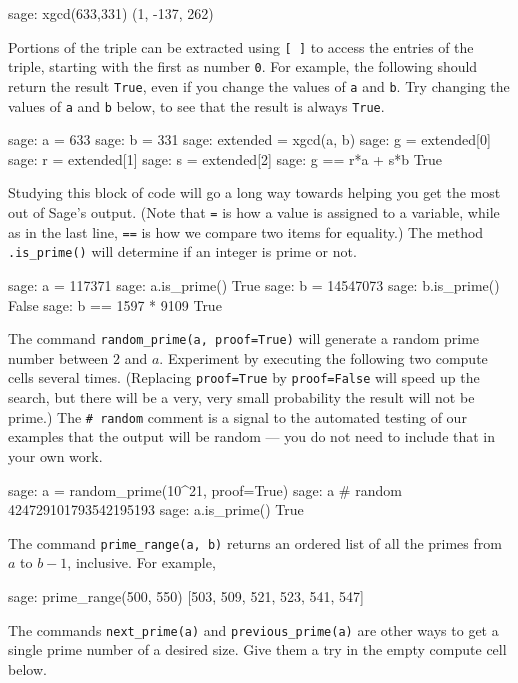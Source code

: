 %
\begin{sageexample}
sage: xgcd(633,331)
(1, -137, 262)
\end{sageexample}
%
Portions of the triple can be extracted using \verb?[ ]? to access the entries of the triple, starting with the first as number \verb?0?.  For example, the following should return the result \verb?True?, even if you change the values of \verb?a? and \verb?b?.  Try changing the values of \verb?a? and \verb?b? below, to see that the result is always \verb?True?.\par
%
\begin{sageexample}
sage: a = 633
sage: b = 331
sage: extended = xgcd(a, b)
sage: g = extended[0]
sage: r = extended[1]
sage: s = extended[2]
sage: g == r*a + s*b
True
\end{sageexample}
%
Studying this block of code will go a long way towards helping you get the most out of Sage's output.  (Note that \verb?=? is how a value is assigned to a variable, while as in the last line, \verb?==? is how we compare two items for equality.)
%
%
%
The method \verb?.is_prime()? will determine if an integer is prime or not.
%
\begin{sageexample}
sage: a = 117371
sage: a.is_prime()
True
sage: b = 14547073
sage: b.is_prime()
False
sage: b == 1597 * 9109
True
\end{sageexample}
%
The command \verb?random_prime(a, proof=True)? will generate a random prime number between $2$ and $a$.
Experiment by executing the following two compute cells several times.  (Replacing \verb?proof=True? by \verb?proof=False? will speed up the search, but there will be a very, very small probability the result will not be prime.)  The \verb!# random! comment is a signal to the automated testing of our examples that the output will be random --- you do not need to include that in your own work.
%
\begin{sageexample}
sage: a = random_prime(10^21, proof=True)
sage: a                          # random
424729101793542195193
sage: a.is_prime()
True
\end{sageexample}
%
The command \verb?prime_range(a, b)? returns an ordered list of all the primes from $a$ to $b-1$, inclusive.  For example,
%
\begin{sageexample}
sage: prime_range(500, 550)
[503, 509, 521, 523, 541, 547]
\end{sageexample}
%
The commands \verb?next_prime(a)? and \verb?previous_prime(a)? are other ways to get a single prime number of a desired size.  Give them a try in the empty compute cell below.
